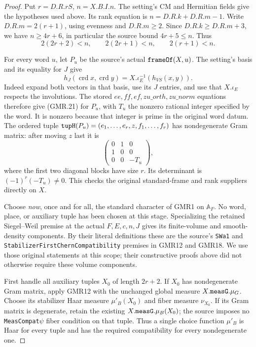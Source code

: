 \documentclass[11pt,a4paper]{article}
\numberwithin{equation}{section}
\theoremstyle{remark}\newtheorem{remark}[theorem]{Remark}
\begin{document}
\begin{proof}
Put $r=D.R.rS$, $n=X.B.I.n$.  The setting's CM and Hermitian fields
give the hypotheses used above.  Its rank equation is
$n=D.R.k+D.R.m-1$.  Write $D.R.m=2(r+1)$, using evenness and
$D.R.m\geq2$.  Since $D.R.k\geq D.R.m+3$, we have
$n\geq4r+6$, in particular the source bound $4r+5\leq n$.
Thus
\[
 2(2r+2)<n,\qquad 2(2r+1)<n,\qquad 2(r+1)<n.
 \tag{GMR.30}
\]

For every word $u$, let $P_u$ be the source's actual
$\texttt{frame\allowbreak Of}(X,u)$.  The setting's basis and its equality for
$J$ give
\[
 h_J(\operatorname{crd}x,\operatorname{crd}y)
   =X.\iota_E^{-1}(h_{VS}(x,y)).
 \tag{GMR.31}
\]
Indeed expand both vectors in that basis, use its $J$ entries, and
use that $X.\iota_E$ respects the involutions.  The stored
$ee,ff,ef,zu\_\allowbreak orth,zu\_\allowbreak norm$ equations therefore give (GMR.21)
for $P_u$, with $T_u$ the nonzero rational integer specified by the
word.  It is nonzero because that integer is prime in the original
word datum.  The ordered tuple
$\texttt{tup\allowbreak H}(P_u)=(e_1,\ldots,e_r,z,f_1,\ldots,f_r)$ has
nondegenerate Gram matrix: after moving $z$ last it is
\[
 \begin{pmatrix}0&1&0\\1&0&0\\0&0&-T_u\end{pmatrix},
 \tag{GMR.32}
\]
where the first two diagonal blocks have size $r$.  Its determinant
is $(-1)^r(-T_u)\ne0$.  This checks the original standard-frame
and rank suppliers directly on $X$.

Choose \emph{now}, once and for all, the standard character of GMR1
on $\mathbb A_F$.  No word, place, or auxiliary tuple has been chosen
at this stage.  Specializing the retained Siegel--Weil premise at
the actual $F,E,c,n,J$ gives its finite-volume and smooth-density
components.  By their literal definitions these are the source's
\texttt{SWa1} and \texttt{Stabilizer\allowbreak First\allowbreak Chern\allowbreak Compatibility} premises
in GMR12 and GMR18.  We use those original statements at this scope;
their constructive proofs above did not otherwise require these
volume components.

First handle all auxiliary tuples $X_0$ of length $2r+2$.
If $X_0$ has nondegenerate Gram matrix, apply GMR12 with the
unchanged global measure $X.\texttt{meas\allowbreak G}.\mu_G$.
Choose its stabilizer Haar measure $\mu'_B(X_0)$ and fiber measure
$\nu_{X_0}$.  If its Gram matrix is degenerate, retain the existing
$X.\texttt{meas\allowbreak G}.\mu_B(X_0)$; the source imposes no
\texttt{MeasCompat\ensuremath{\psi}} fiber condition on that tuple.
Thus a single choice function $\mu'_B$ is Haar for every tuple and
has the required compatibility for every nondegenerate one.


\end{proof}
\end{document}
